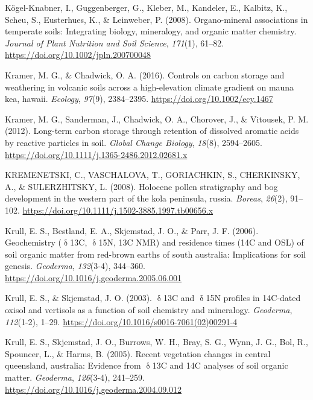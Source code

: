 \documentclass[]{article}
\begin{document}
\leavevmode\hypertarget{ref-K_gel_Knabner_2008}{}%
Kögel-Knabner, I., Guggenberger, G., Kleber, M., Kandeler, E., Kalbitz,
K., Scheu, S., Eusterhues, K., \& Leinweber, P. (2008). Organo-mineral
associations in temperate soils: Integrating biology, mineralogy, and
organic matter chemistry. \emph{Journal of Plant Nutrition and Soil
Science}, \emph{171}(1), 61--82.
\url{https://doi.org/10.1002/jpln.200700048}

\leavevmode\hypertarget{ref-Kramer_2016}{}%
Kramer, M. G., \& Chadwick, O. A. (2016). Controls on carbon storage and
weathering in volcanic soils across a high-elevation climate gradient on
mauna kea, hawaii. \emph{Ecology}, \emph{97}(9), 2384--2395.
\url{https://doi.org/10.1002/ecy.1467}

\leavevmode\hypertarget{ref-Kramer_2012}{}%
Kramer, M. G., Sanderman, J., Chadwick, O. A., Chorover, J., \&
Vitousek, P. M. (2012). Long-term carbon storage through retention of
dissolved aromatic acids by reactive particles in soil. \emph{Global
Change Biology}, \emph{18}(8), 2594--2605.
\url{https://doi.org/10.1111/j.1365-2486.2012.02681.x}

\leavevmode\hypertarget{ref-KREMENETSKI_2008}{}%
KREMENETSKI, C., VASCHALOVA, T., GORIACHKIN, S., CHERKINSKY, A., \&
SULERZHITSKY, L. (2008). Holocene pollen stratigraphy and bog
development in the western part of the kola peninsula, russia.
\emph{Boreas}, \emph{26}(2), 91--102.
\url{https://doi.org/10.1111/j.1502-3885.1997.tb00656.x}

\leavevmode\hypertarget{ref-Krull_2006}{}%
Krull, E. S., Bestland, E. A., Skjemstad, J. O., \& Parr, J. F. (2006).
Geochemistry (\(\updelta\)13C, \(\updelta\)15N, 13C NMR) and residence
times (14C and OSL) of soil organic matter from red-brown earths of
south australia: Implications for soil genesis. \emph{Geoderma},
\emph{132}(3-4), 344--360.
\url{https://doi.org/10.1016/j.geoderma.2005.06.001}

\leavevmode\hypertarget{ref-Krull_2003}{}%
Krull, E. S., \& Skjemstad, J. O. (2003). \(\updelta\)13C and
\(\updelta\)15N profiles in 14C-dated oxisol and vertisols as a function
of soil chemistry and mineralogy. \emph{Geoderma}, \emph{112}(1-2),
1--29. \url{https://doi.org/10.1016/s0016-7061(02)00291-4}

\leavevmode\hypertarget{ref-Krull_2005}{}%
Krull, E. S., Skjemstad, J. O., Burrows, W. H., Bray, S. G., Wynn, J.
G., Bol, R., Spouncer, L., \& Harms, B. (2005). Recent vegetation
changes in central queensland, australia: Evidence from \(\updelta\)13C
and 14C analyses of soil organic matter. \emph{Geoderma},
\emph{126}(3-4), 241--259.
\url{https://doi.org/10.1016/j.geoderma.2004.09.012}
\end{document}

